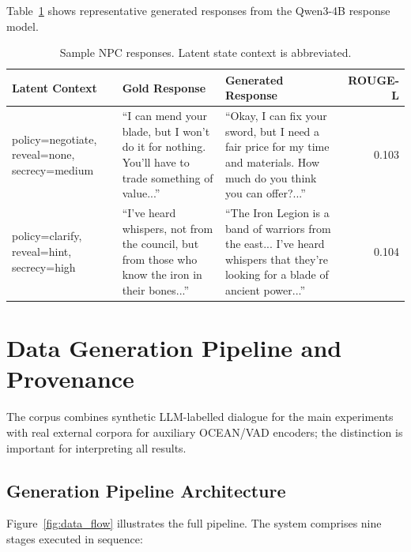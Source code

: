 \documentclass[11pt]{article}
\begin{document}
Table~\ref{tab:samples} shows representative generated responses from the Qwen3-4B response model.

\begin{table}[tp]
\centering
\caption{Sample NPC responses. Latent state context is abbreviated.}
\label{tab:samples}
\footnotesize\setlength{\tabcolsep}{2pt}
\begin{tabular}{@{}p{3.8cm}p{5.2cm}p{5.2cm}r@{}}
\toprule
\textbf{Latent Context} & \textbf{Gold Response} & \textbf{Generated Response} & \textbf{ROUGE-L} \\
\midrule
policy=negotiate, reveal=none, secrecy=medium &
``I can mend your blade, but I won't do it for nothing. You'll have to trade something of value...'' &
``Okay, I can fix your sword, but I need a fair price for my time and materials. How much do you think you can offer?...'' &
0.103 \\
\midrule
policy=clarify, reveal=hint, secrecy=high &
``I've heard whispers, not from the council, but from those who know the iron in their bones...'' &
``The Iron Legion is a band of warriors from the east... I've heard whispers that they're looking for a blade of ancient power...'' &
0.104 \\
\bottomrule
\end{tabular}
\end{table}

\section{Data Generation Pipeline and Provenance}
\label{app:datagen}

The corpus combines synthetic LLM-labelled dialogue for the main experiments with real external corpora for auxiliary OCEAN/VAD encoders; the distinction is important for interpreting all results.

\subsection{Generation Pipeline Architecture}

Figure~\ref{fig:data_flow} illustrates the full pipeline.
The system comprises nine stages executed in sequence:
\end{document}
